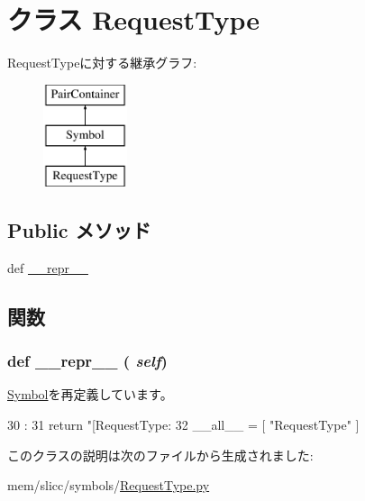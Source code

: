 \hypertarget{classslicc_1_1symbols_1_1RequestType_1_1RequestType}{
\section{クラス RequestType}
\label{classslicc_1_1symbols_1_1RequestType_1_1RequestType}
}
RequestTypeに対する継承グラフ:\begin{figure}[H]
\begin{center}
\leavevmode
\includegraphics[height=3cm]{classslicc_1_1symbols_1_1RequestType_1_1RequestType}
\end{center}
\end{figure}
\subsection*{Public メソッド}
\begin{DoxyCompactItemize}
\item 
def \hyperlink{classslicc_1_1symbols_1_1RequestType_1_1RequestType_ad8b9328939df072e4740cd9a63189744}{\_\-\_\-repr\_\-\_\-}
\end{DoxyCompactItemize}


\subsection{関数}
\hypertarget{classslicc_1_1symbols_1_1RequestType_1_1RequestType_ad8b9328939df072e4740cd9a63189744}{
\subsubsection[{\_\-\_\-repr\_\-\_\-}]{\setlength{\rightskip}{0pt plus 5cm}def \_\-\_\-repr\_\-\_\- ( {\em self})}}
\label{classslicc_1_1symbols_1_1RequestType_1_1RequestType_ad8b9328939df072e4740cd9a63189744}


\hyperlink{classslicc_1_1symbols_1_1Symbol_1_1Symbol_ad8b9328939df072e4740cd9a63189744}{Symbol}を再定義しています。


\begin{DoxyCode}
30                       :
31         return "[RequestType: %
32 
__all__ = [ "RequestType" ]
\end{DoxyCode}


このクラスの説明は次のファイルから生成されました:\begin{DoxyCompactItemize}
\item 
mem/slicc/symbols/\hyperlink{RequestType_8py}{RequestType.py}\end{DoxyCompactItemize}

